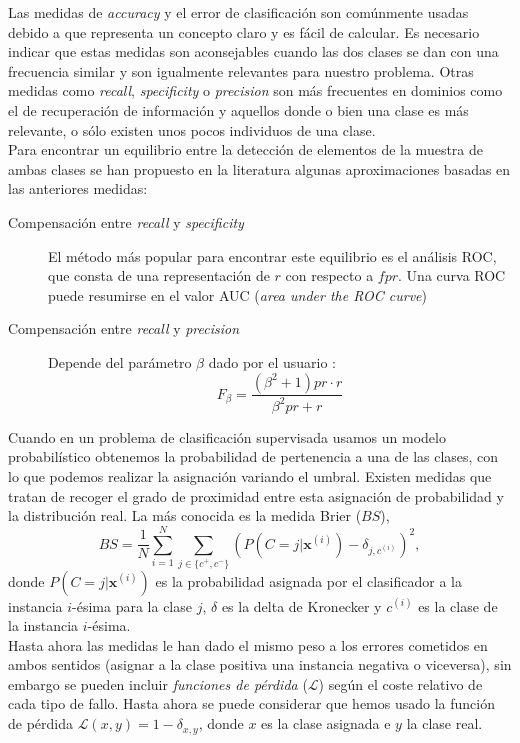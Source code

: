 	Las medidas de \textit{accuracy} y el error de clasificación son comúnmente usadas debido a que representa un concepto claro y es fácil de calcular.  Es necesario indicar que estas medidas son aconsejables cuando las dos clases se dan con una frecuencia similar y son igualmente relevantes para nuestro problema. Otras medidas como \textit{recall}, \textit{specificity} o \textit{precision} son más frecuentes en dominios como el de recuperación de información y aquellos donde o bien una clase es más relevante, o sólo existen unos pocos individuos de una clase.\\
	Para encontrar un equilibrio entre la detección de elementos de la muestra de ambas clases se han propuesto en la literatura algunas aproximaciones basadas en las anteriores medidas:
	
	\begin{description}
		\item[Compensación entre \textit{recall} y \textit{specificity}] El método más popular para encontrar este equilibrio es el análisis ROC, que consta de una representación de $r$ con respecto a $fpr$. Una curva ROC puede resumirse en el valor AUC (\textit{area under the ROC curve})
		\item[Compensación entre \textit{recall} y \textit{precision}] Depende del parámetro $\beta$ dado por el usuario :
		\[ F_\beta = \frac{(\beta^2+1) pr \cdot r}
						  {\beta^2 pr + r}	\]
	\end{description}

	Cuando en un problema de clasificación supervisada usamos un modelo probabilístico obtenemos la probabilidad de pertenencia a una de las clases, con lo que podemos realizar la asignación variando el umbral. Existen medidas que tratan de recoger el grado de proximidad entre esta asignación de probabilidad y la distribución real. La más conocida es la medida Brier ($BS$),
	\[ BS = \frac{1}{N} \sum\limits_{i=1}^N 
		\sum\limits_{j \in \{c^+,c^-\}}
			\left( P \left( C=j|\mathbf{x}^{(i)} \right) -
			\delta_{j,c^{(i)}} \right) ^2,\]
	donde $P\left(C=j|\mathbf{x}^{(i)}\right)$ es la probabilidad asignada por el clasificador a la instancia $i$-ésima para la clase $j$, $\delta$ es la delta de Kronecker y $c^{(i)}$ es la clase de la instancia $i$-ésima.\\
	Hasta ahora las medidas le han dado el mismo peso a los errores cometidos en ambos sentidos (asignar a la clase positiva una instancia negativa o viceversa), sin embargo se pueden incluir \textit{funciones de pérdida} ($\mathcal{L}$) según el coste relativo de cada tipo de fallo. Hasta ahora se puede considerar que hemos usado la función de pérdida $\mathcal{L}(x,y) = 1 - \delta_{x,y} $, donde $x$ es la clase asignada e $y$ la clase real.
	
